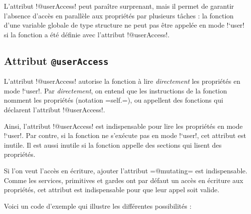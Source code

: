 L'attribut \plm!@userAccess! peut paraître surprenant, mais il permet de garantir l'absence d'accès en parallèle aux propriétés par plusieurs tâches : la fonction d'une variable globale de type structure ne peut pas être appelée en mode \plm!`user! si la fonction a été définie avec l'attribut  \plm!@userAccess!.

\subsection{Attribut \texttt{@userAccess}}

L'attribut \plm!@userAccess! autorise la fonction à lire \emph{directement} les propriétés en mode \plm!`user!. Par \emph{directement}, on entend que les instructions de la fonction nomment les propriétés (notation \plm=self.=), ou appellent des fonctions qui déclarent l'attribut \plm!@userAccess!.

Ainsi, l'attribut \plm!@userAccess! est indispensable pour lire les propriétés en mode \plm!`user!. Par contre, si la fonction ne s'exécute pas en mode \plm!`user!, cet attribut est inutile. Il est aussi inutile si la fonction appelle des sections qui lisent des propriétés.

Si l'on veut l'accès en écriture, ajouter l'attribut \plm=@mutating= est indispensable. Comme les services, primitives et gardes ont par défaut un accès en écriture aux propriétés, cet attribut est indispensable pour que leur appel soit valide. 

Voici un code d'exemple qui illustre les différentes possibilités :

